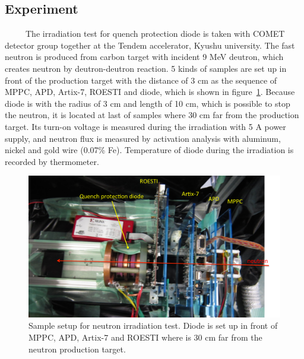  \subsection{Experiment}
~~~~~The irradiation test for quench protection diode is taken with COMET detector group together at the Tendem accelerator, Kyushu university.
The fast neutron is produced from carbon target with incident 9 MeV deutron, which creates neutron by deutron-deutron reaction.
5 kinds of samples are set up in front of the production target with the distance of 3 cm as the sequence of MPPC, APD, Artix-7, ROESTI and diode, which is shown in figure~\ref{3setup}.
Because diode is with the radius of 3 cm and length of 10 cm, which is possible to stop the neutron, it is located at last of samples where 30 cm far from the production target.
Its turn-on voltage is measured during the irradiation with 5 A power supply, and neutron flux is measured by activation analysis with aluminum, nickel and gold wire (0.07\% Fe).
Temperature of diode during the irradiation is recorded by thermometer.
 \begin{figure}[H]
  \centering
  \includegraphics[scale=0.45]{chapter4/fig/diodepic.pdf}
  \caption{Sample setup for neutron irradiation test. Diode is set up in front of MPPC, APD, Artix-7 and ROESTI where is 30 cm far from the neutron production target.}
  \label{3setup}
 \end{figure}
  
